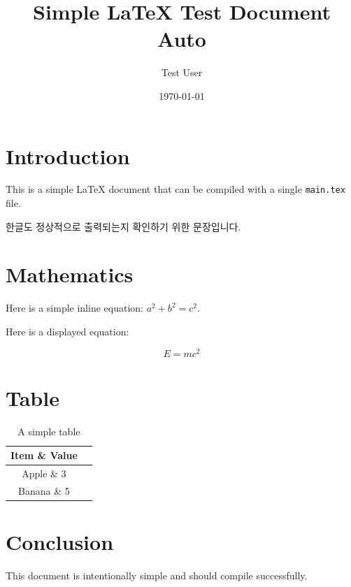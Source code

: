 \documentclass{article}
\title{Simple LaTeX Test Document Auto}
\author{Test User}
\date{\today}
\begin{document}
\maketitle

\section{Introduction}

This is a simple LaTeX document that can be compiled with a single
\texttt{main.tex} file.

한글도 정상적으로 출력되는지 확인하기 위한 문장입니다.



\section{Mathematics}

Here is a simple inline equation: $a^2 + b^2 = c^2$.

Here is a displayed equation:

\[
    E = mc^2
\]

\section{Table}

\begin{table}[h]
    \centering
    \begin{tabular}{|c|c|}
        \hline
        Item \& Value \\
        \hline
        Apple \& 3 \\
        Banana \& 5 \\
        \hline
    \end{tabular}
    \caption{A simple table}
\end{table}

\section{Conclusion}

This document is intentionally simple and should compile successfully.
\end{document}
